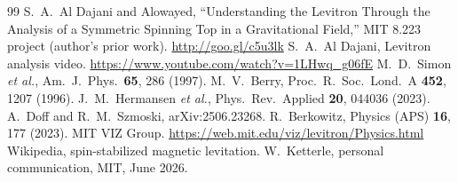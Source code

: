 \documentclass[aps,prl,reprint,groupedaddress,superscriptaddress]{revtex4-2}
\begin{document}
\begin{thebibliography}{99}
 S.~A.~Al Dajani and Alowayed, ``Understanding the Levitron Through the Analysis of a Symmetric Spinning Top in a Gravitational Field,'' MIT 8.223 project (author's prior work). \url{http://goo.gl/c5u3lk}
 S.~A.~Al Dajani, Levitron analysis video. \url{https://www.youtube.com/watch?v=1LHwq_g06fE}
 M.~D.~Simon \textit{et al.}, Am.\ J.\ Phys.\ \textbf{65}, 286 (1997).
 M.~V.~Berry, Proc.\ R.\ Soc.\ Lond.\ A \textbf{452}, 1207 (1996).
 J.~M.~Hermansen \textit{et al.}, Phys.\ Rev.\ Applied \textbf{20}, 044036 (2023).
 A.~Doff and R.~M.~Szmoski, arXiv:2506.23268.
 R.~Berkowitz, Physics (APS) \textbf{16}, 177 (2023).
 MIT VIZ Group. \url{https://web.mit.edu/viz/levitron/Physics.html}
 Wikipedia, spin-stabilized magnetic levitation.
 W.~Ketterle, personal communication, MIT, June 2026.
\end{thebibliography}
\end{document}
